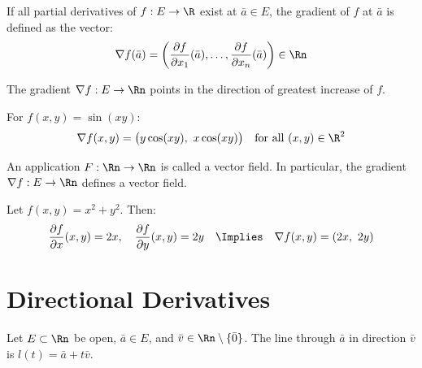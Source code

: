 \begin{definition}[Gradient]
    If all partial derivatives of $f: E \to \R$ exist at $\bar{a} \in E$, the gradient of $f$ at $\bar{a}$ is defined as the vector:
    \[
        \nabla f(\bar{a}) = \left(\frac{\partial f}{\partial x_1}(\bar{a}), \ldots, \frac{\partial f}{\partial x_n}(\bar{a})\right) \in \Rn
    \]
\end{definition}
The gradient $\nabla f: E \to \Rn$ points in the direction of greatest increase of $f$.

\begin{eg}
    For $f(x,y) = \sin(xy)$:
    \[
        \nabla f(x,y) = \bigl(y\cos(xy),\ x\cos(xy)\bigr) \quad \text{for all } (x,y) \in \R^2
    \]
\end{eg}

\begin{definition}
    An application $F: \Rn \to \Rn$ is called a vector field. In particular, the gradient $\nabla f: E \to \Rn$ defines a vector field.
\end{definition}

\begin{eg}
    Let $f(x,y) = x^2 + y^2$. Then:
    \[
        \frac{\partial f}{\partial x}(x,y) = 2x, \quad \frac{\partial f}{\partial y}(x,y) = 2y \quad \Implies \quad \nabla f(x,y) = (2x,\ 2y)
    \]
\end{eg}

\section{Directional Derivatives}

Let $E \subset \Rn$ be open, $\bar{a} \in E$, and $\bar{v} \in \Rn \setminus \{\bar{0}\}$. The line through $\bar{a}$ in direction $\bar{v}$ is $l(t) = \bar{a} + t\bar{v}$.

